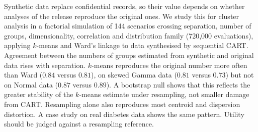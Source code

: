 Synthetic data replace confidential records, so their value depends
on whether analyses of the release reproduce the original ones. We study
this for cluster analysis in a factorial simulation of 144 scenarios crossing
separation, number of groups, dimensionality, correlation and distribution
family (720{,}000 evaluations), applying $k$-means and Ward's linkage to data
synthesised by sequential CART. Agreement between the numbers of groups
estimated from synthetic and original data rises with separation. $k$-means
reproduces the original number more often than Ward ($0.84$ versus $0.81$),
on skewed Gamma data ($0.81$ versus $0.73$) but not on Normal data ($0.87$
versus $0.89$). A bootstrap null shows that this reflects the greater
stability of the $k$-means estimate under resampling, not smaller damage from
CART. Resampling alone also reproduces most centroid and dispersion distortion.
A case study on real diabetes data shows the same pattern.
Utility should be judged against a resampling reference.%
